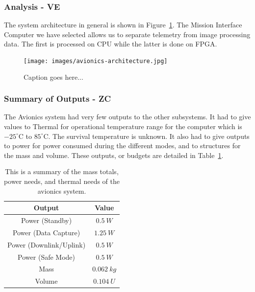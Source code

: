 \documentclass[12pt]{article}
\begin{document}
			\subsubsection{Analysis - VE}
The system architecture in general is shown in Figure~\ref{fig:avionics_architecture}. The Mission Interface Computer we have selected allows us to separate telemetry from image processing data. The first is processed on CPU while the latter is done on FPGA.

\begin{figure}[ht]
\centering
  \texttt{[image: images/avionics-architecture.jpg]}
\caption{Caption goes here...}
\label{fig:avionics_architecture}
\end{figure}

			\subsubsection{Summary of Outputs - ZC}
The Avionics system had very few outputs to the other subsystems. It had to give values to Thermal for operational temperature range for the computer which is $-25^\circ$C to $85^\circ$C. The survival temperature is unknown. It also had to give outputs to power for power consumed during the different modes, and to structures for the mass and volume. These outputs, or budgets are detailed in Table~\ref{table:avionics_summary_outputs}.

\begin{table}[ht]
\caption{This is a summary of the mass totals, power needs, and thermal needs of the avionics system.}
\label{table:avionics_summary_outputs}
\begin{center}
    \begin{tabular}{|c||c|} \hline
    	Output & Value \\ \hline \hline
    Power (Standby) & $0.5\ W$  \\
    Power (Data Capture) & $1.25\ W$ \\
    Power (Downlink/Uplink) & $0.5\ W$ \\
    Power (Safe Mode) & $0.5\ W$ \\
    Mass & $0.062\ kg$  \\
    Volume & $0.104\ U$ \\ \hline 
    \end{tabular}
\end{center}
\end{table}
\end{document}
